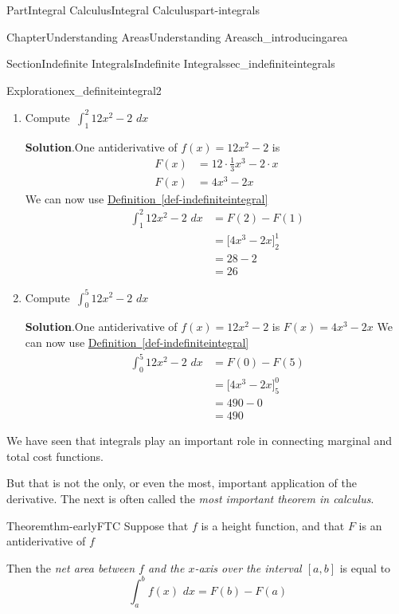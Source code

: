 \documentclass{tufte-book}
\newcommand{\blocktitlefont}{\relax}
\newcommand{\xreffont}{\relax}
\numberwithin{equation}{chapter}
\newcommand{\intdx}[1]{{\,\int#1\,\,dx}}
\newcommand{\amp}{&}
\begin{document}
\begin{partptx}{Part}{Integral Calculus}{}{Integral Calculus}{}{}{part-integrals}
\begin{chapterptx}{Chapter}{Understanding Areas}{}{Understanding Areas}{}{}{ch_introducingarea}
\begin{sectionptx}{Section}{Indefinite Integrals}{}{Indefinite Integrals}{}{}{sec_indefiniteintegrals}
\begin{exploration}{Exploration}{}{ex_definiteintegral2}
\begin{enumerate}[font=\bfseries,label=(\alph*),ref=\alph*]
\item{}Compute \(\intdx{_1^2 12x^2 - 2} \)%
\par\smallskip%
\noindent\textbf{\blocktitlefont Solution}.\hypertarget{ex_definiteintegral2-1-2}{}\quad{}One antiderivative of \(f(x) = 12x^2 - 2 \) is%
\begin{align*}
F(x) \amp = 12\cdot\frac{1}{3}x^3 - 2\cdot x\\
F(x) \amp = 4x^3 - 2x
\end{align*}
We can now use \hyperref[def-indefiniteintegral]{Definition~{\xreffont\ref{def-indefiniteintegral}}}%
\begin{align*}
\intdx{_1^2 12x^2 - 2}  \amp = F(2) - F(1) \\
\amp = \Big[ 4x^3 - 2x \Big]_2^1\\
\amp = 28-2 \\
\amp = 26 
\end{align*}
%
\item{}Compute \(\intdx{_0^5 12x^2 - 2} \)%
\par\smallskip%
\noindent\textbf{\blocktitlefont Solution}.\hypertarget{ex_definiteintegral2-2-2}{}\quad{}One antiderivative of \(f(x) = 12x^2 - 2 \) is \(F(x)= 4x^3 - 2x \) We can now use \hyperref[def-indefiniteintegral]{Definition~{\xreffont\ref{def-indefiniteintegral}}}%
\begin{align*}
\intdx{_0^5 12x^2 - 2}  \amp = F(0) - F(5) \\
\amp = \Big[ 4x^3 - 2x \Big]_5^0\\
\amp = 490-0 \\
\amp = 490 
\end{align*}
%
\end{enumerate}%
\end{exploration}%
We have seen that integrals play an important role in connecting marginal and total cost functions.%
\par
But that  is not the only, or even the most, important application of the derivative.  The next is often called the \emph{most important theorem in calculus}.%
\begin{theorem}{Theorem}{}{}{thm-earlyFTC}%
Suppose that \(f\) is a height function, and that \(F\) is an antiderivative of \(f\)%
\par
Then the \emph{net area between \(f\) and the \(x\)-axis over the interval \([a,b]\)} is equal to%
\begin{equation*}
\intdx{_a^b f(x) } = F(b) - F(a) 
\end{equation*}
%
\end{theorem}

\end{sectionptx}
\end{chapterptx}
\end{partptx}
\end{document}
